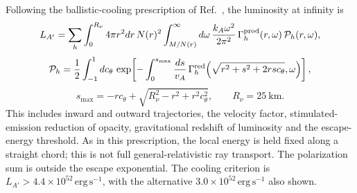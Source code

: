 \documentclass[12pt,a4paper]{article}
\begin{document}
Following the ballistic-cooling prescription of Ref.~\cite{Blinov:2025aha}, the luminosity at infinity is
\[
L_{A'}=\sum_h\int_0^{R_\nu}4\pi r^2dr\,N(r)^2
\int_{M/N(r)}^\infty d\omega\,
\frac{k_A\omega^2}{2\pi^2}\,
\Gamma_h^{\rm prod}(r,\omega)\,
\mathcal P_h(r,\omega),
\]
\[
\mathcal P_h=\frac12\int_{-1}^{1}dc_\theta\,
\exp\!\left[-\int_0^{s_{\max}}
\frac{ds}{v_A}\,
\Gamma_h^{\rm red}\!\left(\sqrt{r^2+s^2+2rsc_\theta},\omega\right)\right],
\]
\[
s_{\max}=-rc_\theta+\sqrt{R_\nu^2-r^2+r^2c_\theta^2},
\qquad R_\nu=25~\mathrm{km}.
\]
This includes inward and outward trajectories, the velocity factor, stimulated-emission reduction of opacity, gravitational redshift of luminosity and the escape-energy threshold. As in this prescription, the local energy is held fixed along a straight chord; this is not full general-relativistic ray transport. The polarization sum is outside the escape exponential. The cooling criterion is \(L_{A'}>4.4\times10^{52}\,\mathrm{erg\,s^{-1}}\), with the alternative \(3.0\times10^{52}\,\mathrm{erg\,s^{-1}}\) also shown.
\end{document}
